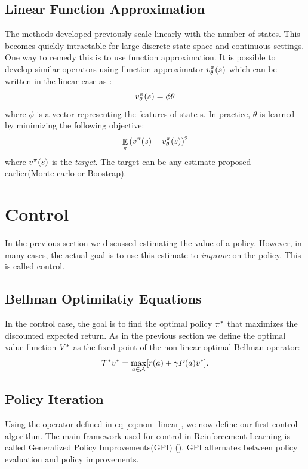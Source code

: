\subsection{Linear Function Approximation}
The methods developed previously scale linearly with the number of states. This becomes quickly intractable for large discrete state space and continuous settings. One way to remedy this is to use function approximation. It is possible to develop similar operators using function approximator $v^{\pi}_{\theta}(s)$ which can be written in the linear case as :
\begin{equation}
    v^{\pi}_{\theta}(s) = \phi \theta
\end{equation}
where $\phi$ is a vector representing the features of state s. In practice, $\theta$ is learned by minimizing the following objective:
\begin{equation}
    \mathop{\mathbb{E}}_{\pi}{(v^{\pi}(s)-v^{\pi}_{\theta}(s))^2}
\end{equation}
where $v^{\pi}(s)$ is the \emph{target}. The target can be any estimate proposed earlier(Monte-carlo or Boostrap).
\section{Control}
In the previous section we discussed estimating the value of a policy. However, in many cases, the actual goal is to use this estimate to \emph{improve} on the policy. This is called control.
\subsection{Bellman Optimilatiy Equations}
In the control case, the goal is to find the optimal policy $\pi^*$ that maximizes the discounted expected return. As in the previous section we define the optimal value function $V^*$ as the fixed point of the non-linear optimal Bellman operator:
\begin{equation}
\label{eq:non_linear}
    \mathcal{T}^* v^* = \max_{a \in \mathcal{A}} [r(a) + \gamma P(a)v^*].
\end{equation}

\subsection{Policy Iteration}
Using the operator defined in eq \ref{eq:non_linear}, we now define our first control algorithm. The main framework used for control in Reinforcement Learning is called Generalized Policy Improvements(GPI) (\cite{sutton1998reinforcement}). GPI alternates between policy evaluation and policy improvements.\\

